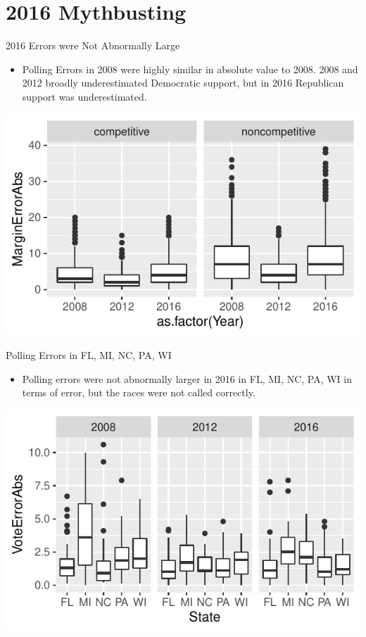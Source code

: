 \documentclass{beamer}\usepackage[]{graphicx}\usepackage[]{color}
\makeatletter
\def\maxwidth{ %
  \ifdim\Gin@nat@width>\linewidth
    \linewidth
  \else
    \Gin@nat@width
  \fi
}
\newenvironment{knitrout}{}{} %
\makeatother
\begin{document}
\section{2016 Mythbusting}
\begin{frame}{2016 Errors were Not Abnormally Large}
\begin{itemize}
\item Polling Errors in 2008 were highly similar in absolute value to 2008. 2008 and 2012 broadly underestimated Democratic support, but in 2016 Republican support was underestimated.
\end{itemize}
\begin{knitrout}
\color{fgcolor}
\includegraphics[width=\maxwidth]{figure/unnamed-chunk-8-1} 

\end{knitrout}
\end{frame}
\begin{frame}{Polling Errors in FL, MI, NC, PA, WI}
\begin{itemize}
\item Polling errors were not abnormally larger in 2016 in FL, MI, NC, PA, WI in terms of error, but the races were not called correctly.  
\end{itemize}
\begin{knitrout}
\color{fgcolor}
\includegraphics[width=\maxwidth]{figure/unnamed-chunk-9-1} 

\end{knitrout}
\end{frame}
\end{document}

